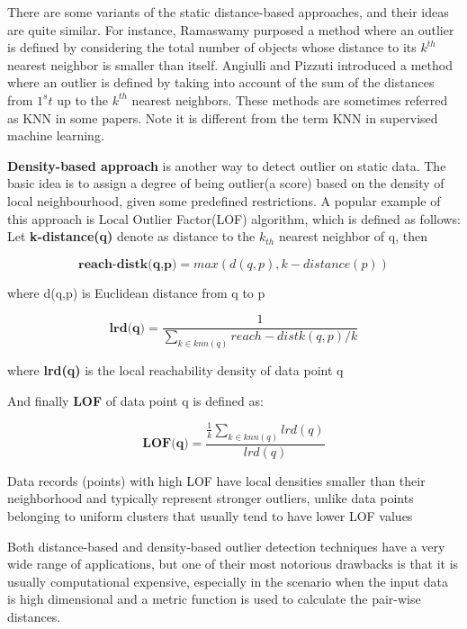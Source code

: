 \documentclass[11pt]{article}       %
\begin{document}
There are some variants of the static distance-based approaches, and their ideas are quite similar. For instance, Ramaswamy\cite{Ramaswamy:2000:EAM:342009.335437} purposed a method where an outlier is defined by considering the total number of objects whose distance to its $k^{th}$ nearest neighbor is smaller than itself. Angiulli and Pizzuti\cite{1377172} introduced a method where an outlier is defined by taking into account of the sum of the distances from $1^st$ up to the $k^{th}$ nearest neighbors. These methods are sometimes referred as KNN in some papers. Note it is different from the term KNN in supervised machine learning. 

\textbf{Density-based approach} is another way to detect outlier on static data. The basic idea is to assign a degree of being outlier(a score) based on the density of local neighbourhood, given some predefined restrictions. A popular example of this approach is Local Outlier Factor(LOF) algorithm\cite{Breunig:2000:LID:342009.335388}, which is defined as follows: Let \textbf{k-distance(q)} denote as distance to the $k_{th}$ nearest neighbor of q, then

\begin{equation}
\textbf{reach-distk(q,p)} = max(d(q,p), k-distance(p))
\end{equation}

where d(q,p) is Euclidean distance from q to p  

\begin{equation}
\textbf{lrd(q)} =  \frac{1}{\sum\limits_{k \in knn(q)} reach-distk(q,p) / k}
\end{equation}

where \textbf{lrd(q)} is the local reachability density of data point q

And finally \textbf{LOF} of data point q is defined as:

\begin{equation}
\textbf{LOF(q)} = \frac{\frac{1}{k} \sum_{k \in knn(q)} lrd(q)}{lrd(q)}
\end{equation}

Data records (points) with high LOF have local densities smaller than their neighborhood and typically represent stronger outliers, unlike data points belonging to uniform clusters that usually tend to have lower LOF values\cite{4221341}

Both distance-based and density-based outlier detection techniques have a very wide range of applications, but one of their most notorious drawbacks is that it is usually computational expensive, especially in the scenario when the input data is high dimensional and a metric function is used to calculate the pair-wise distances.  
\end{document}
